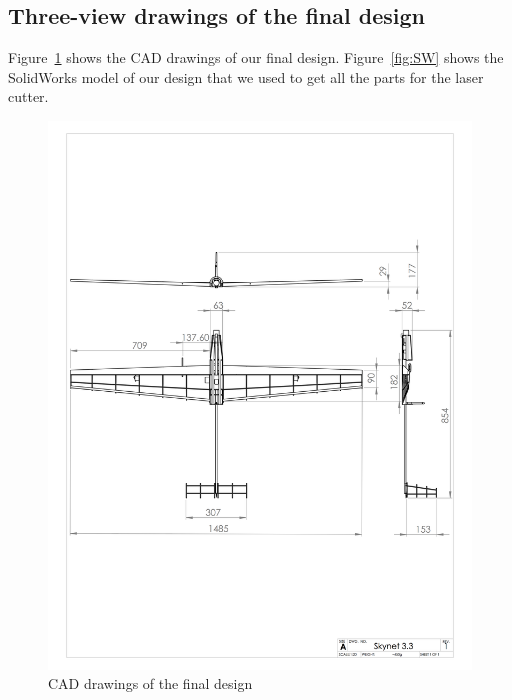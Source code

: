 \documentclass[11pt]{article}
\begin{document}
    \subsection{Three-view drawings of the final design}

    Figure~\ref{fig:CAD} shows the CAD drawings of our final design. Figure~\ref{fig:SW} shows the SolidWorks model of our design that we used to get all the parts for the laser cutter.

    \begin{figure}[h!]
    	\centering
    	\includegraphics[width=\textwidth]{Figures/CAD/Aircraft_Design_3-3.png}
    	\caption{CAD drawings of the final design}\label{fig:CAD}
    \end{figure}
\end{document}
